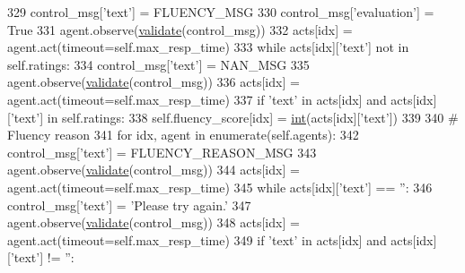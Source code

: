 \begin{DoxyCode}
329                         control\_msg[\textcolor{stringliteral}{'text'}] = FLUENCY\_MSG
330                         control\_msg[\textcolor{stringliteral}{'evaluation'}] = \textcolor{keyword}{True}
331                         agent.observe(\hyperlink{namespaceparlai_1_1core_1_1worlds_afc3fad603b7bce41dbdc9cdc04a9c794}{validate}(control\_msg))
332                         acts[idx] = agent.act(timeout=self.max\_resp\_time)
333                         \textcolor{keywordflow}{while} acts[idx][\textcolor{stringliteral}{'text'}] \textcolor{keywordflow}{not} \textcolor{keywordflow}{in} self.ratings:
334                             control\_msg[\textcolor{stringliteral}{'text'}] = NAN\_MSG
335                             agent.observe(\hyperlink{namespaceparlai_1_1core_1_1worlds_afc3fad603b7bce41dbdc9cdc04a9c794}{validate}(control\_msg))
336                             acts[idx] = agent.act(timeout=self.max\_resp\_time)
337                         \textcolor{keywordflow}{if} \textcolor{stringliteral}{'text'} \textcolor{keywordflow}{in} acts[idx] \textcolor{keywordflow}{and} acts[idx][\textcolor{stringliteral}{'text'}] \textcolor{keywordflow}{in} self.ratings:
338                             self.fluency\_score[idx] = \hyperlink{namespacelanguage__model_1_1eval__ppl_a7d12ee00479673c5c8d1f6d01faa272a}{int}(acts[idx][\textcolor{stringliteral}{'text'}])
339 
340                     \textcolor{comment}{# Fluency reason}
341                     \textcolor{keywordflow}{for} idx, agent \textcolor{keywordflow}{in} enumerate(self.agents):
342                         control\_msg[\textcolor{stringliteral}{'text'}] = FLUENCY\_REASON\_MSG
343                         agent.observe(\hyperlink{namespaceparlai_1_1core_1_1worlds_afc3fad603b7bce41dbdc9cdc04a9c794}{validate}(control\_msg))
344                         acts[idx] = agent.act(timeout=self.max\_resp\_time)
345                         \textcolor{keywordflow}{while} acts[idx][\textcolor{stringliteral}{'text'}] == \textcolor{stringliteral}{''}:
346                             control\_msg[\textcolor{stringliteral}{'text'}] = \textcolor{stringliteral}{'Please try again.'}
347                             agent.observe(\hyperlink{namespaceparlai_1_1core_1_1worlds_afc3fad603b7bce41dbdc9cdc04a9c794}{validate}(control\_msg))
348                             acts[idx] = agent.act(timeout=self.max\_resp\_time)
349                         \textcolor{keywordflow}{if} \textcolor{stringliteral}{'text'} \textcolor{keywordflow}{in} acts[idx] \textcolor{keywordflow}{and} acts[idx][\textcolor{stringliteral}{'text'}] != \textcolor{stringliteral}{''}:

\end{DoxyCode}
